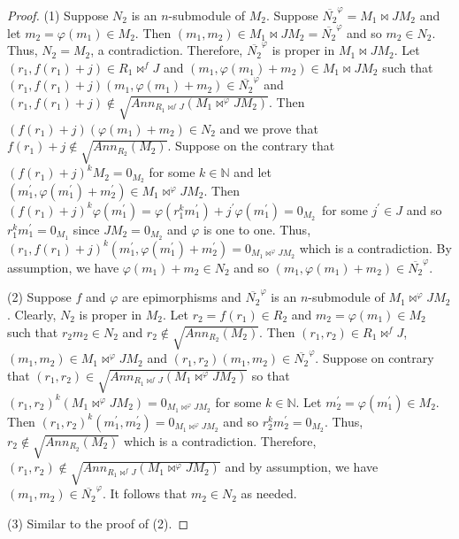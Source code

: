 \documentclass{amsart}%
\providecommand{\U}[1]{\protect\rule{.1in}{.1in}}
\theoremstyle{plain}
\numberwithin{equation}{section}
\begin{document}
\begin{proof}
(1) Suppose $N_{2}$ is an $n$-submodule of $M_{2}$. Suppose $\overline{N_{2}%
}^{\varphi}=M_{1}\Join JM_{2}$ and let $m_{2}=\varphi(m_{1})\in M_{2}$. Then
$(m_{1},m_{2})\in M_{1}\Join JM_{2}=\overline{N_{2}}^{\varphi}$ and so
$m_{2}\in N_{2}$. Thus, $N_{2}=M_{2}$, a contradiction. Therefore,
$\overline{N_{2}}^{\varphi}$ is proper in $M_{1}\Join JM_{2}$. Let
$(r_{1},f(r_{1})+j)\in R_{1}\Join^{f}J$ and $(m_{1},\varphi(m_{1})+m_{2})\in
M_{1}\Join JM_{2}$ such that $(r_{1},f(r_{1})+j)(m_{1},\varphi(m_{1}%
)+m_{2})\in\overline{N_{2}}^{\varphi}$ and $(r_{1},f(r_{1})+j)\notin
\sqrt{Ann_{R_{1}\Join^{f}J}(M_{1}\Join^{\varphi}JM_{2})}$. Then $(f(r_{1}%
)+j)(\varphi(m_{1})+m_{2})\in N_{2}$ and we prove that $f(r_{1})+j\notin
\sqrt{Ann_{R_{2}}(M_{2})}$. Suppose on the contrary that $(f(r_{1}%
)+j)^{k}M_{2}=0_{M_{2}}$ for some $k\in%
\mathbb{N}
$ and let $(m_{1}^{\prime},\varphi(m_{1}^{\prime})+m_{2}^{\prime})\in
M_{1}\Join^{\varphi}JM_{2}$. Then $(f(r_{1})+j)^{k}\varphi(m_{1}^{\prime
})=\varphi(r_{1}^{k}m_{1}^{\prime})+j^{\prime}\varphi(m_{1}^{\prime}%
)=0_{M_{2}}$\ for some $j^{\prime}\in J$ and so $r_{1}^{k}m_{1}^{\prime
}=0_{M_{1}}$ since $JM_{2}=0_{M_{2}}$ and $\varphi$ is one to one. Thus,
$(r_{1},f(r_{1})+j)^{k}(m_{1}^{\prime},\varphi(m_{1}^{\prime})+m_{2}^{\prime
})=0_{M_{1}\Join^{\varphi}JM_{2}}$ which is a contradiction. By assumption, we
have $\varphi(m_{1})+m_{2}\in N_{2}$ and so $(m_{1},\varphi(m_{1})+m_{2}%
)\in\overline{N_{2}}^{\varphi}$.

(2) Suppose $f$ and $\varphi$ are epimorphisms and $\overline{N_{2}}^{\varphi
}$ is an $n$-submodule of $M_{1}\Join^{\varphi}JM_{2}$. Clearly, $N_{2}$ is
proper in $M_{2}$. Let $r_{2}=f(r_{1})\in R_{2}$ and $m_{2}=\varphi(m_{1})\in
M_{2}$ such that $r_{2}m_{2}\in N_{2}$ and $r_{2}\notin\sqrt{Ann_{R_{2}}%
(M_{2})}$. Then $(r_{1},r_{2})\in R_{1}\Join^{f}J$, $(m_{1},m_{2})\in
M_{1}\Join^{\varphi}JM_{2}$ and $(r_{1},r_{2})(m_{1},m_{2})\in\overline{N_{2}%
}^{\varphi}$. Suppose on contrary that $(r_{1},r_{2})\in\sqrt{Ann_{R_{1}%
\Join^{f}J}(M_{1}\Join^{\varphi}JM_{2})}$ so that $(r_{1},r_{2})^{k}%
(M_{1}\Join^{\varphi}JM_{2})=0_{M_{1}\Join^{\varphi}JM_{2}}$ for some $k\in%
\mathbb{N}
$. Let $m_{2}^{\prime}=\varphi(m_{1}^{\prime})\in M_{2}$. Then $(r_{1}%
,r_{2})^{k}(m_{1}^{\prime},m_{2}^{\prime})=0_{M_{1}\Join^{\varphi}JM_{2}}$ and
so $r_{2}^{k}m_{2}^{\prime}=0_{M_{2}}$. Thus, $r_{2}\notin\sqrt{Ann_{R_{2}%
}(M_{2})}$ which is a contradiction. Therefore, $(r_{1},r_{2})\notin
\sqrt{Ann_{R_{1}\Join^{f}J}(M_{1}\Join^{\varphi}JM_{2})}$ and by assumption,
we have $(m_{1},m_{2})\in\overline{N_{2}}^{\varphi}$. It follows that
$m_{2}\in N_{2}$ as needed.

(3) Similar to the proof of (2).
\end{proof}
\end{document}
